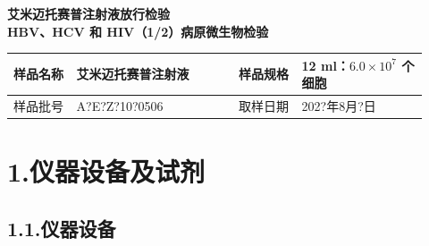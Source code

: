 \documentclass[UTF8,10pt,a4paper,fontset=fandol]{ctexart}
\newcommand{\fieldvalue}[1]{#1}
\newcommand{\handwritten}[1]{#1}
\begin{document}
\begin{center}
{\large\bfseries 艾米迈托赛普注射液放行检验}\\[0.3em]
\textbf{HBV、HCV 和 HIV（1/2）病原微生物检验}
\end{center}

\begin{tabular}{|p{0.14\linewidth}|p{0.36\linewidth}|p{0.14\linewidth}|p{0.28\linewidth}|}
\hline
样品名称 &
\fieldvalue{艾米迈托赛普注射液} &
样品规格 &
\fieldvalue{12 ml：$6.0\times10^{7}$ 个细胞}
\\ \hline
样品批号 &
\fieldvalue{\handwritten{A?E?Z?10?0506}} &
取样日期 &
\fieldvalue{\handwritten{202?年8月?日}}
\\ \hline
\end{tabular}

\section*{1.\quad 仪器设备及试剂}

\subsection*{1.1.\quad 仪器设备}
\end{document}
